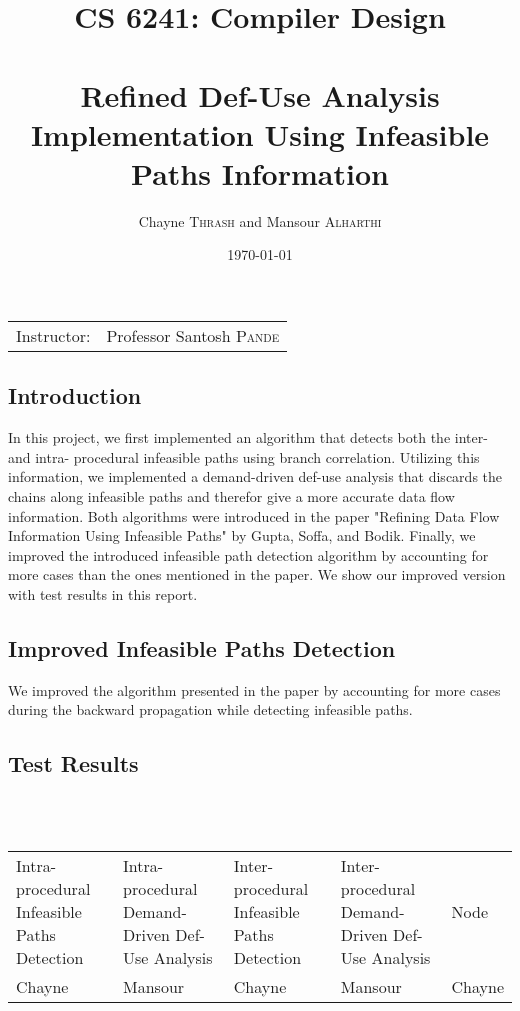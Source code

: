 \documentclass{article}
\title{CS 6241: Compiler Design \\~\\ Refined Def-Use Analysis Implementation Using Infeasible Paths Information} %
\author{Chayne \textsc{Thrash} and Mansour \textsc{Alharthi}} %
\date{\today} %
\begin{document}
\maketitle %

\begin{center}
\begin{tabular}{l r}
Instructor: & Professor Santosh \textsc{Pande} %
\end{tabular}
\end{center}

\subsection{Introduction}
In this project, we first implemented an algorithm that detects both the inter- and intra- procedural infeasible paths using branch correlation. Utilizing this information, we implemented a demand-driven def-use analysis that discards the chains along infeasible paths and therefor give a more accurate data flow information. Both algorithms were introduced in the paper "Refining Data Flow Information Using Infeasible Paths" by Gupta, Soffa, and Bodik. Finally, we improved the introduced infeasible path detection algorithm by accounting for more cases than the ones mentioned in the paper. We show our improved version with test results in this report.

\subsection{Improved Infeasible Paths Detection}
We improved the algorithm presented in the paper by accounting for more cases during the backward propagation while detecting infeasible paths. 

\subsection{Test Results}
~\\~
\begin{adjustbox}{center}
\renewcommand{\arraystretch}{2}
\begin{tabular}{| C{3cm} | C{3cm} | C{3cm} | C{3cm} | C{3cm} |}
\hline
Intra-procedural Infeasible Paths Detection & Intra-procedural Demand-Driven Def-Use Analysis & Inter-procedural Infeasible Paths Detection  & Inter-procedural Demand-Driven Def-Use Analysis & Node \\  
Chayne & Mansour & Chayne & Mansour & Chayne \\ 

\end{tabular}
\end{adjustbox}
\end{document}
